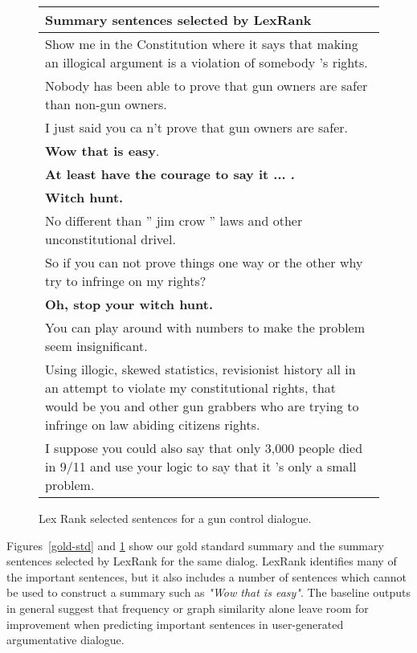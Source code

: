\documentclass[11pt]{article}
\begin{document}
\begin{figure}[th!]
\begin{small}
{\begin{tabular}{|p{2.8in}|}

\hline  {\bf  Summary sentences selected by LexRank}  \\ \hline 

Show me in the Constitution where it says that making an illogical argument is a violation of somebody 's rights.  \\  \hline
Nobody has been able to prove that gun owners are safer than non-gun owners. \\  \hline
I just said you ca n't prove that gun owners are safer. \\  \hline
{\bf Wow that is easy}. \\  \hline
{\bf At least have the courage to say it ... .} \\  \hline
{\bf Witch hunt. }\\  \hline
No different than '' jim crow '' laws and other unconstitutional drivel. \\  \hline
So if you can not prove things one way or the other why try to infringe on my rights? \\  \hline
{\bf Oh, stop your witch hunt. }\\  \hline
You can play around with numbers to make the problem seem insignificant. \\  \hline
Using illogic, skewed statistics, revisionist history all in an attempt to violate my constitutional rights, that would be you and other gun grabbers who are trying to infringe on law abiding citizens rights. \\  \hline
I suppose you could also say that only 3,000 people died in 9/11 and use your logic to say that it 's only a small problem. \\  \hline

\end{tabular}}
\end{small}
\caption{\label{lex-summ} Lex Rank selected sentences for a gun control dialogue.}
\end{figure}

Figures~\ref{gold-std} and \ref{lex-summ} show our gold standard
summary and the summary sentences selected by LexRank for the same
dialog. LexRank identifies many of the important sentences, but it
also includes a number of sentences which cannot be used to construct
a summary such as {\it "Wow that is easy"}. The baseline outputs in
general suggest that frequency or graph similarity alone leave room
for improvement when predicting important sentences in user-generated
argumentative dialogue.
\end{document}
